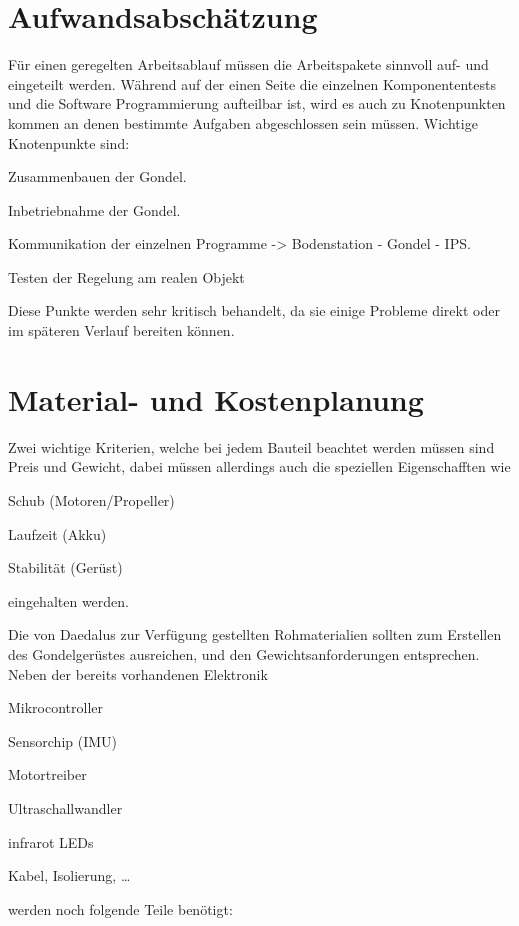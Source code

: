 \documentclass[lang=ngerman,inputenc=utf8,fontsize=10pt]{ldvarticle}
\begin{document}
\newpage 
\section{Aufwandsabschätzung}

Für einen geregelten Arbeitsablauf müssen die Arbeitspakete sinnvoll auf- und eingeteilt werden.
Während auf der einen Seite die einzelnen Komponententests und die Software Programmierung aufteilbar ist, wird es auch zu Knotenpunkten kommen an denen bestimmte Aufgaben abgeschlossen sein müssen. Wichtige Knotenpunkte sind:
\begin{list}{-}{}

\item Zusammenbauen der Gondel.
\item Inbetriebnahme der Gondel.
\item Kommunikation der einzelnen Programme -> Bodenstation - Gondel - IPS.
\item Testen der Regelung am realen Objekt
\end{list}

Diese Punkte werden sehr kritisch behandelt, da sie einige Probleme direkt oder im späteren Verlauf bereiten können.


\section{Material- und Kostenplanung}


Zwei wichtige Kriterien, welche bei jedem Bauteil beachtet werden müssen sind Preis und Gewicht, dabei müssen allerdings auch die speziellen Eigenschafften wie
\begin{list}{-}{}
\item Schub (Motoren/Propeller)
\item Laufzeit (Akku)
\item Stabilität (Gerüst)
\end{list}
eingehalten werden.

Die von Daedalus zur Verfügung gestellten Rohmaterialien sollten zum Erstellen des Gondelgerüstes ausreichen, und den Gewichtsanforderungen entsprechen. Neben der bereits vorhandenen Elektronik
\begin{list}{-}{}
\item Mikrocontroller
\item Sensorchip (IMU)
\item Motortreiber
\item Ultraschallwandler
\item infrarot LEDs
\item Kabel, Isolierung, …
\end{list}
werden noch folgende Teile benötigt:
\end{document}
